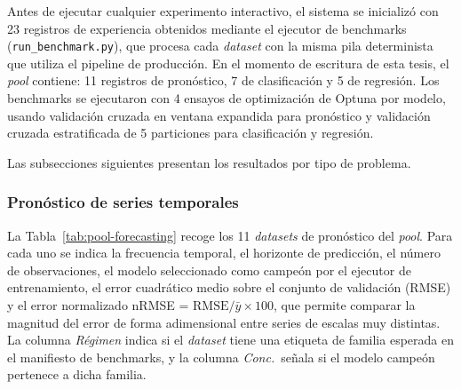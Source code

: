 Antes de ejecutar cualquier experimento interactivo, el sistema se inicializó con 23
registros de experiencia obtenidos mediante el ejecutor de benchmarks
(\texttt{run\_benchmark.py}), que procesa cada \textit{dataset} con la misma pila
determinista que utiliza el pipeline de producción.
En el momento de escritura de esta tesis, el \textit{pool} contiene: 11 registros de
pronóstico, 7 de clasificación y 5 de regresión.
Los benchmarks se ejecutaron con 4 ensayos de optimización de Optuna por modelo,
usando validación cruzada en ventana expandida para pronóstico y validación cruzada
estratificada de 5 particiones para clasificación y regresión.

Las subsecciones siguientes presentan los resultados por tipo de problema.


\subsubsection{Pronóstico de series temporales}
\label{sec:pool-forecasting}

La Tabla~\ref{tab:pool-forecasting} recoge los 11 \textit{datasets} de pronóstico
del \textit{pool}.
Para cada uno se indica la frecuencia temporal, el horizonte de predicción, el número
de observaciones, el modelo seleccionado como campeón por el ejecutor de
entrenamiento, el error cuadrático medio sobre el conjunto de validación (RMSE) y el
error normalizado nRMSE = $\text{RMSE} / \bar{y} \times 100$, que permite comparar
la magnitud del error de forma adimensional entre series de escalas muy distintas.
La columna \textit{Régimen} indica si el \textit{dataset} tiene una etiqueta de
familia esperada en el manifiesto de benchmarks, y la columna \textit{Conc.}\ señala
si el modelo campeón pertenece a dicha familia.

